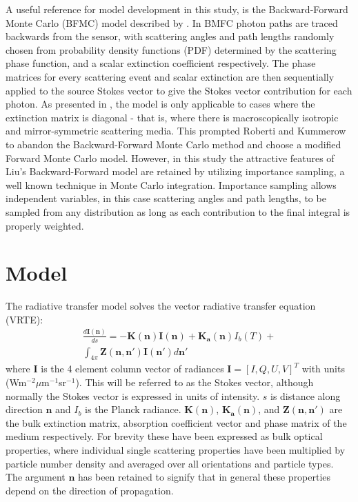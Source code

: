 A useful reference for model development in this study, is the
Backward-Forward Monte Carlo (BFMC) model described by \cite{liu96}.  
In BMFC photon paths are traced backwards
from the sensor, with scattering angles and path lengths randomly
chosen from probability density functions (PDF) determined by the scattering
phase function, and a scalar extinction coefficient respectively.  The
phase matrices for every scattering event and scalar extinction are
then sequentially applied to the source Stokes vector to give the Stokes
vector contribution for each photon.  As presented in \cite{liu96}, the model is only
applicable to cases where the extinction matrix is diagonal - that is,
 where there is macroscopically isotropic and mirror-symmetric
 scattering media.  This prompted Roberti and Kummerow
 \cite{roberti99} to abandon the Backward-Forward Monte Carlo method and
 choose a modified Forward Monte Carlo model. However, in this study the
 attractive features of Liu's Backward-Forward model are retained by
 utilizing importance sampling, a well known technique in Monte Carlo
 integration. Importance sampling allows independent variables, in
 this case scattering angles and path lengths, to be sampled from any
 distribution as long as each contribution to the final integral is
 properly weighted.


\section{Model}
The radiative transfer model solves the vector
radiative transfer equation (VRTE):
\begin{eqnarray}
\frac{d\mathbf{I(n)}}{ds}=-\mathbf{K(n)I(n)} +
\mathbf{K_a(n)}I_b(T) +\nonumber\\
\int_{4\pi}\mathbf{Z(n,n')I(n')}d\mathbf{n'}
\label{vrte}
\end{eqnarray}
where $\mathbf{I}$ is the 4 element column vector of radiances
$\mathbf{I}=\left[I,Q,U,V\right]^T$ with units
(Wm$^{-2}\mu$m$^{-1}$sr$^{-1}$). This will be referred to as the
Stokes vector, although normally the Stokes vector is expressed in
units of intensity.  $s$ is distance along direction $\mathbf{n}$ and
$I_b$ is the Planck radiance. $\mathbf{K(n)}$, $\mathbf{K_a(n)}$,
and $\mathbf{Z(n,n')}$ are the bulk extinction matrix, absorption
coefficient vector and phase matrix of the medium respectively.  For
 brevity these have been expressed as bulk optical
properties, where individual single scattering properties have been
multiplied by particle number density and averaged over all
orientations and particle types. The argument $\mathbf{n}$ has been
retained to signify that in general these properties depend on the
direction of propagation. 

